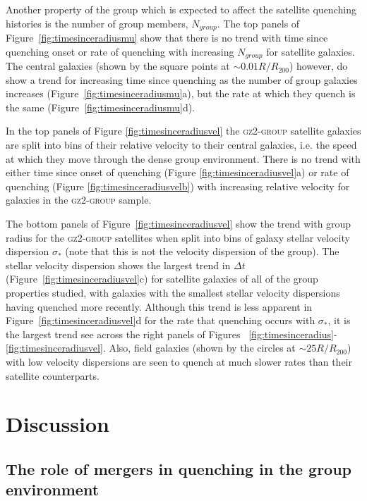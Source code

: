 Another property of the group which is expected to affect the satellite quenching histories is the number of group members, $N_{group}$. The top panels of Figure~\ref{fig:timesinceradiusmu} show that there is no trend with time since quenching onset or rate of quenching with increasing $N_{group}$ for satellite galaxies. The central galaxies (shown by the square points at $\sim 0.01 R/R_{200}$) however, do show a trend for increasing time since quenching as the number of group galaxies increases (Figure~\ref{fig:timesinceradiusmu}a), but the rate at which they quench is the same (Figure~\ref{fig:timesinceradiusmu}d).

In the top panels of Figure \ref{fig:timesinceradiusvel} the \textsc{gz2-group} satellite galaxies are split into bins of their relative velocity to their central galaxies, i.e. the speed at which they move through the dense group environment. There is no trend with either time since onset of quenching (Figure \ref{fig:timesinceradiusvel}a) or rate of quenching (Figure \ref{fig:timesinceradiusvelb}) with increasing relative velocity for galaxies in the \textsc{gz2-group} sample.

The bottom panels of Figure~\ref{fig:timesinceradiusvel} show the trend with group radius for the \textsc{gz2-group} satellites when split into bins of galaxy stellar velocity dispersion $\sigma_*$ (note that this is not the velocity dispersion of the group). The stellar velocity dispersion shows the largest trend in $\Delta t$ (Figure~\ref{fig:timesinceradiusvel}c) for satellite galaxies of all of the group properties studied, with galaxies with the smallest stellar velocity dispersions having quenched more recently. Although this trend is less apparent in Figure~\ref{fig:timesinceradiusvel}d for the rate that quenching occurs with $\sigma_*$, it is the largest trend see across the right panels of Figures ~\ref{fig:timesinceradius}-\ref{fig:timesinceradiusvel}. Also, field galaxies (shown by the circles at $\sim 25 R/R_{200}$) with low velocity dispersions are seen to quench at much slower rates than their satellite counterparts.


\section{Discussion}\label{sec:disc}

\subsection{The role of mergers in quenching in the group environment}\label{sec:rolemergerenv}

